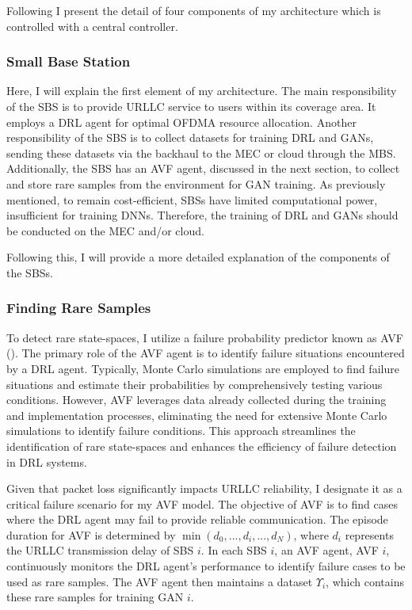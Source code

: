 \documentclass[letterpaper%
, twoside%
, 12pt%
,memoire%
, english%
,creativecommons,hyperref, withAlgo2e %
]{thETS}
\numberwithin{algorithm}{chapter}
\begin{document}
Following I present the detail of four components of my  architecture which is controlled with a central controller.


\subsubsection{Small Base Station}

Here, I will explain the first element of my  architecture. The main responsibility of the SBS is to provide URLLC service to users within its coverage area. It employs a DRL agent for optimal OFDMA resource allocation. Another responsibility of the SBS is to collect datasets for training DRL and GANs, sending these datasets via the backhaul to the MEC or cloud through the MBS. Additionally, the SBS has an AVF agent, discussed in the next section, to collect and store rare samples from the environment for GAN training. As previously mentioned, to remain cost-efficient, SBSs have limited computational power, insufficient for training DNNs. Therefore, the training of DRL and GANs should be conducted on the MEC and/or cloud. 

Following this, I will provide a more detailed explanation of the components of the SBSs.

\subsubsection{Finding Rare Samples}

To detect rare state-spaces, I utilize a failure probability predictor known as AVF (\cite{uesato*2018rigorous}). The primary role of the AVF agent is to identify failure situations encountered by a DRL agent. Typically, Monte Carlo simulations are employed to find failure situations and estimate their probabilities by comprehensively testing various conditions. However, AVF leverages data already collected during the training and implementation processes, eliminating the need for extensive Monte Carlo simulations to identify failure conditions. This approach streamlines the identification of rare state-spaces and enhances the efficiency of failure detection in DRL systems.

Given that packet loss significantly impacts URLLC reliability, I designate it as a critical failure scenario for my  AVF model. The objective of AVF is to find cases where the DRL agent may fail to provide reliable communication. The episode duration for AVF is determined by \( \min(d_0, ..., d_i, ..., d_N) \), where \( d_i \) represents the URLLC transmission delay of SBS \( i \). In each SBS \( i \), an AVF agent, AVF \( i \), continuously monitors the DRL agent's performance to identify failure cases to be used as rare samples. The AVF agent then maintains a dataset \( \Upsilon_i \), which contains these rare samples for training GAN \( i \).
\end{document}
